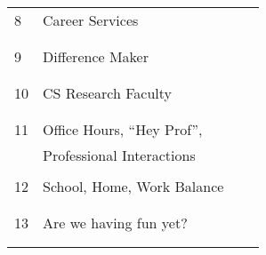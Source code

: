 \begin{center}
\begin{tabular}{|l|l|l|l|}
  8 & Career Services                   &               &  \\
    &                                   &               &  \\
    &                                   &               &  \\\hline
  9 & Difference Maker                  &               &  \\ %
    &                                   &               &  \\
    &                                   &               &  \\\hline
  10 & CS Research Faculty              &               &  \\
    &                                   &               &  \\
    &                                   &               &  \\\hline
  11 & Office Hours, ``Hey Prof'',      &               &  \\
    & Professional Interactions         &               &  \\
    &                                   &               &  \\\hline
  12 & School, Home, Work Balance       &               &  \\
    &                                   &               &  \\
    &                                   &               &  \\\hline
  13 & Are we having fun yet?           &               &  \\
    &                                   &               &  \\
    &                                   &               &  \\\hline
\end{tabular}\end{center}

% 
